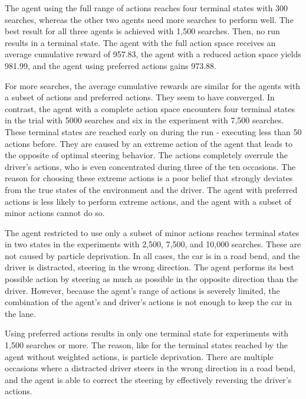

The agent using the full range of actions reaches four terminal states with 300 searches, whereas the other two agents need more searches to perform well. The best result for all three agents is achieved with 1,500 searches. Then, no run results in a terminal state. The agent with the full action space receives an average cumulative reward of 957.83, the agent with a reduced action space yields 981.99, and the agent using preferred actions gains 973.88. 

For more searches, the average cumulative rewards are similar for the agents with a subset of actions and preferred actions. They seem to have converged. In contrast, the agent with a complete action space encounters four terminal states in the trial with 5000 searches and six in the experiment with 7,500 searches. These terminal states are reached early on during the run - executing less than 50 actions before. They are caused by an extreme action of the agent that leads to the opposite of optimal steering behavior. The actions completely overrule the driver's actions, who is even concentrated during three of the ten occasions. The reason for choosing these extreme actions is a poor belief that strongly deviates from the true states of the environment and the driver. The agent with preferred actions is less likely to perform extreme actions, and the agent with a subset of minor actions cannot do so. 

The agent restricted to use only a subset of minor actions reaches terminal states in two states in the experiments with 2,500, 7,500, and 10,000 searches. These are not caused by particle deprivation. In all cases, the car is in a road bend, and the driver is distracted, steering in the wrong direction. The agent performs its best possible action by steering as much as possible in the opposite direction than the driver. However, because the agent's range of actions is severely limited, the combination of the agent's and driver's actions is not enough to keep the car in the lane. 

Using preferred actions results in only one terminal state for experiments with 1,500 searches or more. The reason, like for the terminal states reached by the agent without weighted actions, is particle deprivation. There are multiple occasions where a distracted driver steers in the wrong direction in a road bend, and the agent is able to correct the steering by effectively reversing the driver's actions.

